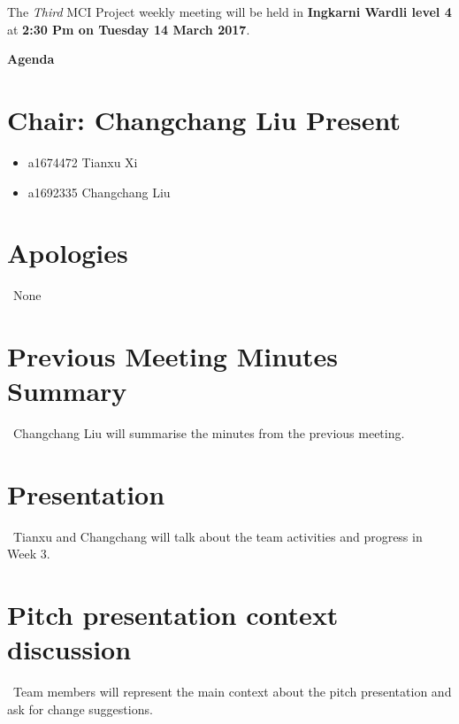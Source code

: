 \documentclass[11pt, a4paper]{article}
\begin{document}
\noindent The {\em Third} MCI Project weekly meeting will be held in {\bf Ingkarni Wardli level 4} at {\bf 2:30 Pm on Tuesday 14 March 2017}.


\vspace*{15pt}

\begin{center}
\huge \bf Agenda
\end{center}



\section*{Chair: Changchang Liu                    Present}
\begin{itemize}
	\item a1674472  Tianxu Xi
	\item a1692335 Changchang Liu
\end{itemize}

\section{Apologies}
\ None \\


\section{Previous Meeting Minutes Summary}
\ Changchang Liu will summarise the minutes from the previous meeting.


\section{Presentation}
\ Tianxu and Changchang will talk about the team activities and progress in Week 3. \\
\section{Pitch presentation context discussion}
\ Team members will  represent the main context about the pitch presentation and ask for change suggestions. \\
\end{document}
